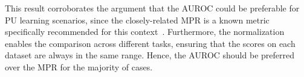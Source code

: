 This result corroborates the argument that the AUROC could be preferable for PU learning scenarios, since the closely-related MPR is a known metric specifically recommended for this context~\cite{pahikkala2015more,johnson2014logistic,hao2017predicting,yu2020fpscdtia}.
%
Furthermore, the normalization enables the comparison across different tasks, ensuring that the scores on each dataset are always in the same range. Hence, the AUROC should be preferred over the MPR for the majority of cases.

%



